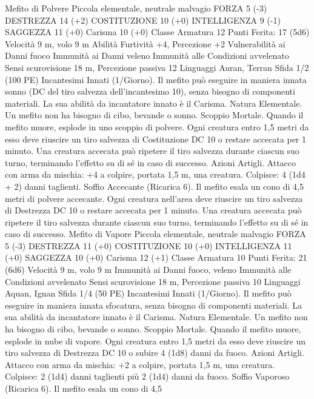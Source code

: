 \begin{multicols}{2}
Mefito di Polvere
Piccola elementale, neutrale malvagio
FORZA 5 (-3)
DESTREZZA 14 (+2)
COSTITUZIONE 10 (+0)
INTELLIGENZA 9 (-1)
SAGGEZZA 11 (+0)
Carisma 10 (+0)
Classe Armatura 12
\hspace*{0pt}\hfill{Punti Ferita}: 17 (5d6)
Velocità 9 m, volo 9 m
Abilità Furtività +4, Percezione +2
Vulnerabilità ai Danni fuoco
Immunità ai Danni veleno
Immunità alle Condizioni avvelenato
Sensi scurovisione 18 m, Percezione passiva 12
Linguaggi Auran, Terran
Sfida 1/2 (100 PE)
Incantesimi Innati (1/Giorno). Il mefito può eseguire in maniera
innata sonno (DC del tiro salvezza dell’incantesimo 10), senza
bisogno di componenti materiali. La sua abilità da incantatore
innato è il Carisma.
Natura Elementale. Un mefito non ha bisogno di cibo, bevande
o sonno.
Scoppio Mortale. Quando il mefito muore, esplode in uno
scoppio di polvere. Ogni creatura entro 1,5 metri da esso deve
riuscire un tiro salvezza di Costituzione DC 10 o restare accecata
per 1 minuto. Una creatura accecata può ripetere il tiro salvezza
durante ciascun suo turno, terminando l’effetto su di sé in caso di
successo.
Azioni
Artigli. Attacco con arma da mischia: +4 a colpire, portata 1,5
m, una creatura.
Colpisce: 4 (1d4 + 2) danni taglienti.
Soffio Accecante (Ricarica 6). Il mefito esala un cono di 4,5
metri di polvere accecante. Ogni creatura nell’area deve riuscire
un tiro salvezza di Destrezza DC 10 o restare accecata per 1
minuto. Una creatura accecata può ripetere il tiro salvezza
durante ciascun suo turno, terminando l’effetto su di sé in caso di
successo.
Mefito di Vapore
Piccola elementale, neutrale malvagio
FORZA 5 (-3)
DESTREZZA 11 (+0)
COSTITUZIONE 10 (+0)
INTELLIGENZA 11 (+0)
SAGGEZZA 10 (+0)
Carisma 12 (+1)
Classe Armatura 10
\hspace*{0pt}\hfill{Punti Ferita}: 21 (6d6)
Velocità 9 m, volo 9 m
Immunità ai Danni fuoco, veleno
Immunità alle Condizioni avvelenato
Sensi scurovisione 18 m, Percezione passiva 10
Linguaggi Aquan, Ignan
Sfida 1/4 (50 PE)
Incantesimi Innati (1/Giorno). Il mefito può eseguire in maniera
innata sfocatura, senza bisogno di componenti materiali. La sua
abilità da incantatore innato è il Carisma.
Natura Elementale. Un mefito non ha bisogno di cibo, bevande
o sonno.
Scoppio Mortale. Quando il mefito muore, esplode in nube di
vapore. Ogni creatura entro 1,5 metri da esso deve riuscire un
tiro salvezza di Destrezza DC 10 o subire 4 (1d8) danni da fuoco.
Azioni
Artigli. Attacco con arma da mischia: +2 a colpire, portata 1,5
m, una creatura.
Colpisce: 2 (1d4) danni taglienti più 2 (1d4) danni da fuoco.
Soffio Vaporoso (Ricarica 6). Il mefito esala un cono di 4,5

\end{multicols}

